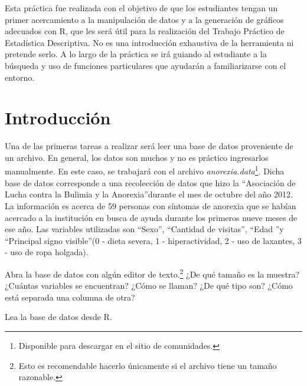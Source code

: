 \documentclass{prob}
\begin{document}
\maketitle

Esta práctica fue realizada con el objetivo de que los estudiantes tengan un primer acercamiento a la manipulación de datos y a la generación de gráficos adecuados con R, que les será útil para la realización del Trabajo Práctico de Estadística Descriptiva. No es una introducción exhaustiva de la herramienta ni pretende serlo. A lo largo de la práctica se irá guiando al estudiante a la búsqueda y uso de funciones particulares que ayudarán a familiarizarse con el entorno.

\section*{Introducción}
    \begin{problema}
	Una de las primeras tareas a realizar será leer una base de datos proveniente de un archivo. En general, los datos son muchos y no es práctico ingresarlos manualmente. En este caso, se trabajará con el archivo \textit{anorexia.data}\footnote{Disponible para descargar en el sitio de comunidades.}. Dicha base de datos corresponde a una recolección de datos que hizo la \textquotedblleft Asociación de Lucha contra la Bulimia y la Anorexia\textquotedblright durante el mes de octubre del año 2012. La información es acerca de 59 personas con síntomas de anorexia que se habían acercado a la institución en busca de ayuda durante los primeros nueve meses de ese año. Las variables utilizadas son \textquotedblleft Sexo\textquotedblright, \textquotedblleft Cantidad de visitas\textquotedblright , \textquotedblleft Edad \textquotedblright y \textquotedblleft Principal signo visible\textquotedblright (0 - dieta severa, 1 - hiperactividad, 2 - uso de laxantes, 3 - uso de ropa holgada).
	
	\begin{parte}
    	Abra la base de datos con algún editor de texto.\footnote{Esto es recomendable hacerlo únicamente si el archivo tiene un tamaño razonable.} ¿De qué tamaño es la muestra? ¿Cuántas variables se encuentran? ¿Cómo se llaman? ¿De qué tipo son? ¿Cómo está separada una columna de otra?
    \end{parte}
 
	\begin{parte}
    	Lea la base de datos desde R. \\
		
		\noindent{}	

    \end{parte}
        	
    \end{problema}
\end{document}
